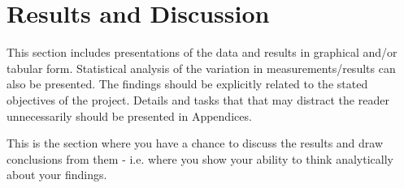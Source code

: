 \section{Results and Discussion}
This section includes presentations of the data and results in graphical and/or tabular form. Statistical analysis of the variation in measurements/results can also be presented. The findings should be explicitly related to the stated objectives of the project. Details and tasks that that may distract the reader unnecessarily should be presented in Appendices.

This is the section where you have a chance to discuss the results and draw conclusions from them - i.e. where you show your ability to think analytically about your findings.

